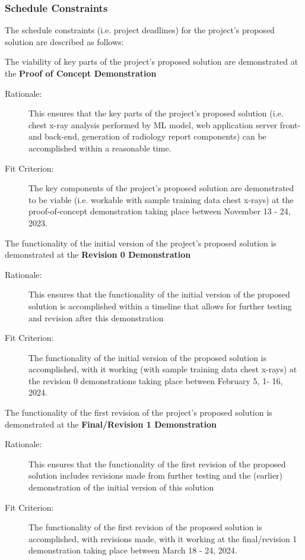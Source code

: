 \documentclass[12pt]{article}
\begin{document}
\subsubsection{Schedule Constraints}
The schedule constraints (i.e. project deadlines) for the project’s proposed solution are described as follows:
\begin{enumerate}[label=MC\arabic*., resume*=mc]
    \begin{item}
        The viability of key parts of the project's proposed solution are demonstrated at the \textbf{Proof of Concept Demonstration}
        \begin{description}
            \item[Rationale:] This ensures that the key parts of the project's proposed solution (i.e. chest x-ray analysis performed by ML model, web application server front- and back-end, generation of radiology report components) can be accomplished within a reasonable time.
            \item[Fit Criterion:] The key components of the project's proposed solution are demonstrated to be viable (i.e. workable with sample training data chest x-rays) at the proof-of-concept demonstration taking place between November 13 - 24, 2023.
        \end{description}
    \end{item}
    \begin{item}
        The functionality of the initial version of the project's proposed solution is demonstrated at the \textbf{Revision 0 Demonstration}
        \begin{description}
            \item[Rationale:] This ensures that the functionality of the initial version of the proposed solution is accomplished within a timeline that allows for further testing and revision after this demonstration
            \item[Fit Criterion:] The functionality of the initial version of the proposed solution is accomplished, with it working (with sample training data chest x-rays) at the revision 0 demonstrations taking place between February 5, 1- 16, 2024.
        \end{description}
    \end{item}
    \begin{item}
        The functionality of the first revision of the project's proposed solution is demonstrated at the \textbf{Final/Revision 1 Demonstration}
        \begin{description}
            \item[Rationale:] This ensures that the functionality of the first revision of the proposed solution includes revisions made from further testing and the (earlier) demonstration of the initial version of this solution
            \item[Fit Criterion:] The functionality of the first revision of the proposed solution is accomplished, with revisions made, with it working at the final/revision 1 demonstration taking place between March 18 - 24, 2024.
        \end{description}
    \end{item}
\end{enumerate}
\end{document}
